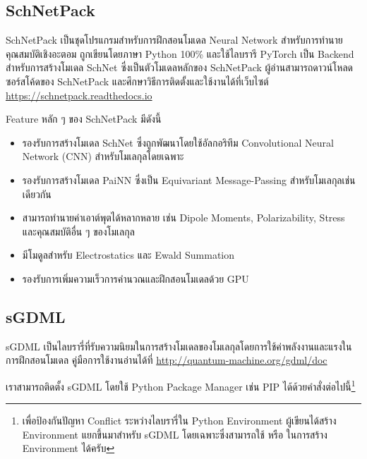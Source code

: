 \subsection{SchNetPack}
\label{ssec:lib_schnetpack}

SchNetPack เป็นชุดโปรแกรมสำหรับการฝึกสอนโมเดล Neural Network สำหรับการทำนายคุณสมบัติเชิงอะตอม\autocite{schutt2019} ถูกเขียนโดยภาษา Python 100\% และใช้ไลบรารี PyTorch เป็น Backend สำหรับการสร้างโมเดล SchNet ซึ่งเป็นตัวโมเดลหลักของ SchNetPack ผู้อ่านสามารถดาวน์โหลดซอร์สโค้ดของ SchNetPack และศึกษาวิธีการติดตั้งและใช้งานได้ที่เว็บไซต์ \url{https://schnetpack.readthedocs.io}

\noindent Feature หลัก ๆ ของ SchNetPack มีดังนี้
%
\begin{itemize}[topsep=0pt,noitemsep]\setlength\itemsep{0.5em}
    \item รองรับการสร้างโมเดล SchNet ซึ่งถูกพัฒนาโดยใช้อัลกอริทึม Convolutional Neural Network (CNN) สำหรับโมเลกุลโดยเฉพาะ\autocite{schutt2017,schutt2017a}
    
    \item รองรับการสร้างโมเดล PaiNN ซึ่งเป็น Equivariant Message-Passing สำหรับโมเลกุลเช่นเดียวกัน\autocite{schutt2021}
    
    \item สามารถทำนายค่าเอาต์พุตได้หลากหลาย เช่น Dipole Moments, Polarizability, Stress และคุณสมบัติอื่น ๆ ของโมเลกุล
    
    \item มีโมดูลสำหรับ Electrostatics และ Ewald Summation
    
    \item รองรับการเพิ่มความเร็วการคำนวณและฝึกสอนโมเดลด้วย GPU
\end{itemize}

\subsection{sGDML}
\label{ssec:lib_sgdml}

sGDML เป็นไลบรารี่ที่รับความนิยมในการสร้างโมเดลของโมเลกุลโดยการใช้ค่าพลังงานและแรงในการฝึกสอนโมเดล\autocite{chmiela2019} คู่มือการใช้งานอ่านได้ที่ \url{http://quantum-machine.org/gdml/doc}

\noindent เราสามารถติดตั้ง sGDML โดยใช้ Python Package Manager เช่น PIP ได้ด้วยคำสั่งต่อไปนี้\footnote{เพื่อป้องกันปัญหา Conflict ระหว่างไลบรารี่ใน Python Environment ผู้เขียนได้สร้าง Environment แยกขึ้นมาสำหรับ sGDML โดยเฉพาะซึ่งสามารถใช้  หรือ  ในการสร้าง Environment ได้ครับ}

